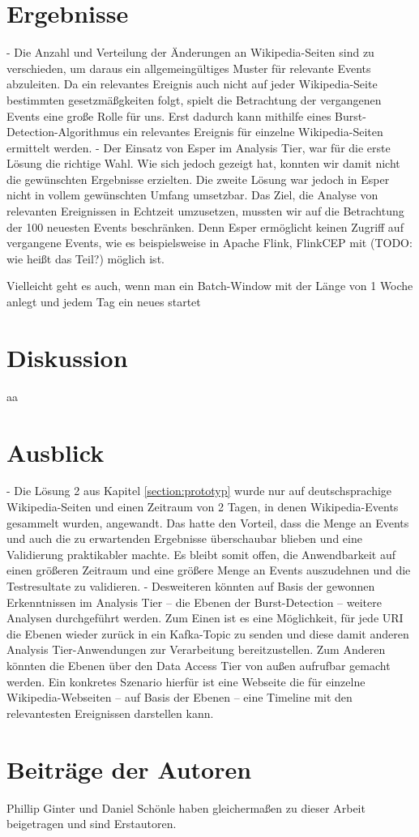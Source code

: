 \section{Ergebnisse}
- Die Anzahl und Verteilung der Änderungen an Wikipedia-Seiten sind zu verschieden, um daraus ein allgemeingültiges Muster für relevante Events abzuleiten.
Da ein relevantes Ereignis auch nicht auf jeder Wikipedia-Seite bestimmten gesetzmäßgkeiten folgt, spielt die Betrachtung der vergangenen Events eine große Rolle für uns.
Erst dadurch kann mithilfe eines Burst-Detection-Algorithmus ein relevantes Ereignis für einzelne Wikipedia-Seiten ermittelt werden.
- Der Einsatz von Esper im Analysis Tier, war für die erste Lösung die richtige Wahl. Wie sich jedoch gezeigt hat, konnten wir damit
nicht die gewünschten Ergebnisse erzielten. Die zweite Lösung war jedoch in Esper nicht in vollem gewünschten Umfang umsetzbar.
Das Ziel, die Analyse von relevanten Ereignissen in Echtzeit umzusetzen, mussten wir auf die Betrachtung der 100 neuesten Events beschränken.
Denn Esper ermöglicht keinen Zugriff auf vergangene Events, wie es beispielsweise in Apache Flink, FlinkCEP mit (TODO: wie heißt das Teil?) möglich ist.

Vielleicht geht es auch, wenn man ein Batch-Window mit der Länge von 1 Woche anlegt und jedem Tag ein neues startet

\section{Diskussion}
aa
\section{Ausblick}
- Die Lösung 2 aus Kapitel \ref{section:prototyp} wurde nur auf deutschsprachige Wikipedia-Seiten und einen Zeitraum von 2 Tagen, in denen Wikipedia-Events gesammelt wurden, angewandt.
Das hatte den Vorteil, dass die Menge an Events und auch die zu erwartenden Ergebnisse überschaubar blieben und eine Validierung praktikabler machte.
Es bleibt somit offen, die Anwendbarkeit auf einen größeren Zeitraum und eine größere Menge an Events auszudehnen und die Testresultate zu validieren.
- Desweiteren könnten auf Basis der gewonnen Erkenntnissen im Analysis Tier -- die Ebenen der Burst-Detection -- weitere Analysen durchgeführt werden.
Zum Einen ist es eine Möglichkeit, für jede URI die Ebenen wieder zurück in ein Kafka-Topic zu senden und diese damit anderen Analysis Tier-Anwendungen zur Verarbeitung bereitzustellen.
Zum Anderen könnten die Ebenen über den Data Access Tier von außen aufrufbar gemacht werden. Ein konkretes Szenario hierfür ist eine Webseite
die für einzelne Wikipedia-Webseiten -- auf Basis der Ebenen -- eine Timeline mit den relevantesten Ereignissen darstellen kann.

\section{Beiträge der Autoren}
 Phillip Ginter und Daniel Schönle haben gleichermaßen zu dieser Arbeit beigetragen und sind Erstautoren.
